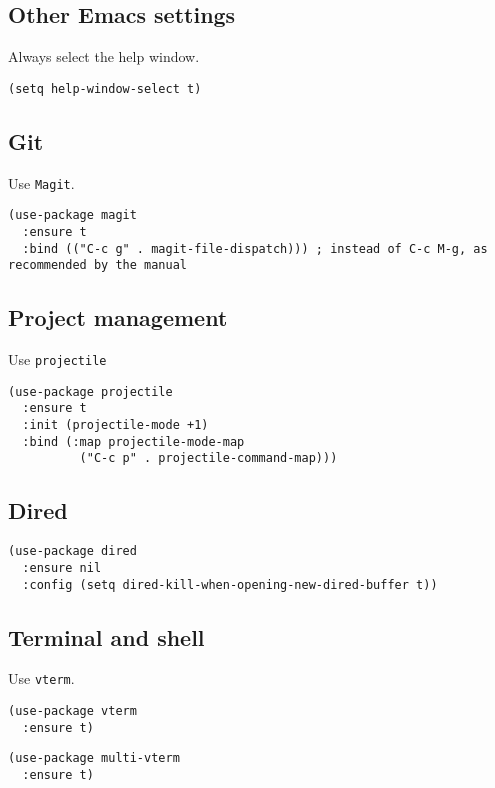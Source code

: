 \documentclass[a4paper,11pt]{article}
\begin{document}
\subsection{Other Emacs settings}
\label{sec:orgc755e0e}
Always select the help window.
\begin{verbatim}
(setq help-window-select t)
\end{verbatim}

\subsection{Git}
\label{sec:org7bd541b}
Use \texttt{Magit}.
\begin{verbatim}
(use-package magit
  :ensure t
  :bind (("C-c g" . magit-file-dispatch))) ; instead of C-c M-g, as recommended by the manual
\end{verbatim}

\subsection{Project management}
\label{sec:org9552ee2}
Use \texttt{projectile}
\begin{verbatim}
(use-package projectile
  :ensure t
  :init (projectile-mode +1)
  :bind (:map projectile-mode-map
	      ("C-c p" . projectile-command-map)))
\end{verbatim}

\subsection{Dired}
\label{sec:org7176a04}
\begin{verbatim}
(use-package dired
  :ensure nil
  :config (setq dired-kill-when-opening-new-dired-buffer t))
\end{verbatim}

\subsection{Terminal and shell}
\label{sec:org41aba48}
Use \texttt{vterm}.
\begin{verbatim}
(use-package vterm
  :ensure t)
\end{verbatim}

\begin{verbatim}
(use-package multi-vterm
  :ensure t)
\end{verbatim}
\end{document}
